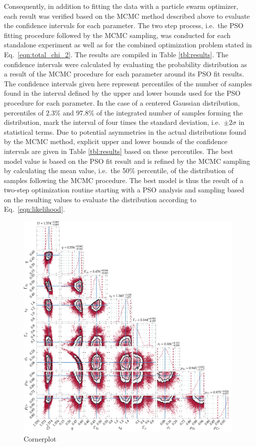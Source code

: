 Consequently, in addition to fitting the data with a particle swarm optimizer, 
each result was verified based on the MCMC method described above to evaluate 
the confidence intervals for each parameter. The two step process, i.e.~the PSO 
fitting procedure followed by the MCMC sampling, was conducted for each 
standalone experiment as well as for the combined optimization problem stated 
in Eq.~\eqref{eqn:total_chi_2}. The results are compiled in Table 
\ref{tbl:results}. The confidence intervals were calculated by evaluating the 
probability distribution as a result of the MCMC procedure for each parameter 
around its PSO fit results. The confidence intervals given here represent 
percentiles of the number of samples found in the interval defined by the upper 
and lower bounds used for the PSO procedure for each parameter. In the case of 
a centered Gaussian distribution, percentiles of $2.3\%$ and $97.8\%$ of the 
integrated number of samples forming the distribution, mark the interval of 
four times the standard deviation, i.e.~$\pm 2\sigma$ in statistical terms. Due 
to potential asymmetries in the actual distributions found by the MCMC method, 
explicit upper and lower bounds of the confidence intervals are given in Table 
\ref{tbl:results} based on these percentiles. The best model value is based on 
the PSO fit result and is refined by the MCMC sampling by calculating the mean 
value, i.e.~the 50\% percentile, of the distribution of samples following the 
MCMC procedure. The best model is thus the result of a two-step optimization 
routine starting with a PSO analysis and sampling based on the resulting values 
to evaluate the distribution according to Eq.~\eqref{eqn:likelihood}.
\begin{figure}[htbp]
  \centering
  \includegraphics[width=\textwidth]{img/CrSc_cornerplot_combined}
  \caption{Cornerplot}
  \label{ch_spec:fig_CrSc_cornerplot_combined}
\end{figure}
